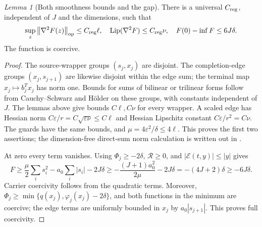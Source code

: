 \documentclass[11pt]{article}
\newtheorem{lemma}[theorem]{Lemma}
\theoremstyle{remark}
\newtheorem{lemma}[lemma]{Lemma}
\theoremstyle{remark}
\newcommand{\eps}{\varepsilon}
\newcommand{\norm}[1]{\left\lVert#1\right\rVert}
\newcommand{\Lip}{\operatorname{Lip}}
\newcommand{\op}{\mathrm{op}}
\begin{document}
\begin{lemma}[Both smoothness bounds and the gap]\label{lem:composition-regularity}
There is a universal $C_{\rm reg}$, independent of $J$ and the dimensions, such that
\begin{equation}\label{eq:composition-regularity-new}
 \sup_z\norm{\nabla^2 F(z)}_{\op}\le C_{\rm reg}\ell,
 \quad \Lip(\nabla^2F)\le C_{\rm reg}\nu,
 \quad F(0)-\inf F\le6J\delta.
\end{equation}
The function is coercive.
\end{lemma}
\begin{proof}
The source-wrapper groups $(s_j,x_j)$ are disjoint. The completion-edge groups $(x_j,s_{j+1})$ are likewise disjoint within the edge sum; the terminal map $x_j\mapsto b_j^Tx_j$ has norm one. Bounds for sums of bilinear or trilinear forms follow from Cauchy--Schwarz and H\"older on these groups, with constants independent of $J$. The lemmas above give bounds $C\ell,C\nu$ for every wrapper. A scaled edge has Hessian norm $C\eps/r=C\sqrt{\eps\nu}\le C\ell$ and Hessian Lipschitz constant $C\eps/r^2=C\nu$. The guards have the same bounds, and $\mu=4\eps^2/\delta\le4\ell$. This proves the first two assertions; the dimension-free direct-sum norm calculation is written out in .

At zero every term vanishes. Using $\Phi_j\ge-2\delta$, $\mathcal R\ge0$, and $|\mathcal E(t,y)|\le|y|$ gives
\[
 F\ge\frac\mu2\sum_i s_i^2-a_0\sum_i|s_i|-2J\delta
 \ge-\frac{(J+1)a_0^2}{2\mu}-2J\delta
 =-(4J+2)\delta\ge-6J\delta.
\]
Carrier coercivity follows from the quadratic terms. Moreover,
$\Phi_j\ge\min\{q(x_j),\varphi_j(x_j)-2\delta\}$, and both functions in the minimum are coercive; the edge terms are uniformly bounded in $x_j$ by $a_0|s_{j+1}|$. This proves full coercivity.
\end{proof}
\end{document}
